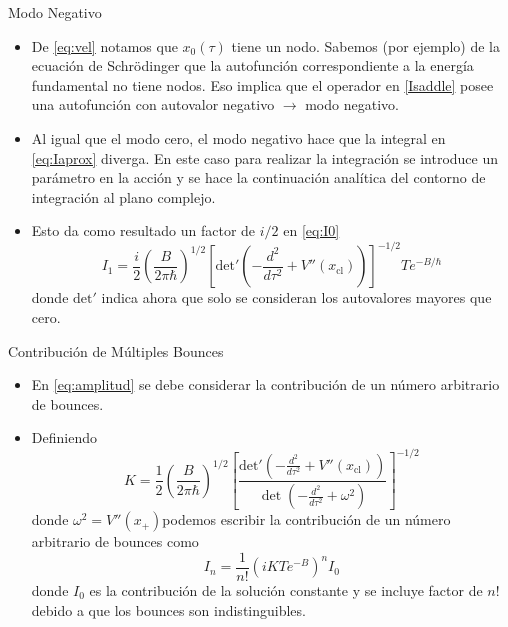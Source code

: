 \documentclass{beamer}
\theoremstyle{example}
\theoremstyle{example}
\begin{document}
\begin{frame}{Modo Negativo}
\begin{itemize}
    \item De \eqref{eq:vel} notamos que $x_0(\tau)$ tiene un nodo. Sabemos (por ejemplo) de la ecuación de Schr\"{o}dinger que la autofunción correspondiente a la energía fundamental no tiene nodos. Eso implica que el operador en \eqref{Isaddle} posee una autofunción con autovalor negativo $\rightarrow$ modo negativo.
    
    \item Al igual que el modo cero, el modo negativo hace que la integral en \eqref{eq:Iaprox} diverga. En este caso para realizar la integración se introduce un parámetro en la acción y se hace la continuación analítica del contorno de integración al plano complejo.
    
    \item Esto da como resultado un factor de $i/2$ en \eqref{eq:I0}
    \begin{equation} \label{eq:negativo}
        I_1 = \frac{i}{2} \left( \frac{B}{2\pi \hbar} \right)^{1/2}  \left[ \textrm{det}' \left(-\frac{d^2}{d\tau^2} + V''(x_{\textrm{cl}}) \right)\right]^{-1/2} T e^{-B/\hbar}
    \end{equation}
    donde $\textrm{det}'$ indica ahora que solo se consideran los autovalores mayores que cero. 
\end{itemize}
\end{frame}

\begin{frame}{Contribución de Múltiples Bounces}
\begin{itemize}
    \item En \eqref{eq:amplitud} se debe considerar la contribución de un número arbitrario de bounces. 
    
    \item Definiendo 
    \begin{equation}
        K = \frac{1}{2} \left(\frac{B}{2\pi\hbar}\right)^{1/2} \left[ \frac{\textrm{det}' \left(-\frac{d^2}{d\tau^2} + V''(x_{\textrm{cl}}) \right)}{\det \left(-\frac{d^2}{d\tau^2} + \omega^2 \right)}\right]^{-1/2}
    \end{equation}
    donde $\omega^2 = V''(x_+)$podemos escribir la contribución de un número arbitrario de bounces como 
    \begin{equation}
        I_n = \frac{1}{n!} \left(iKTe^{-B}\right)^n I_0
    \end{equation}
    donde $I_0$ es la contribución de la solución constante y se incluye factor de $n!$ debido a que los bounces son indistinguibles.
\end{itemize}
\end{frame}
\end{document}

